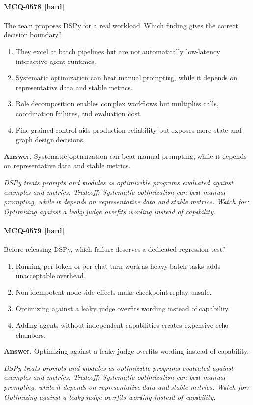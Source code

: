 \paragraph{MCQ-0578 [hard]} The team proposes DSPy for a real workload. Which finding gives the correct decision boundary?
\begin{enumerate}[label=\Alph*.]
\item They excel at batch pipelines but are not automatically low-latency interactive agent runtimes.
\item Systematic optimization can beat manual prompting, while it depends on representative data and stable metrics.
\item Role decomposition enables complex workflows but multiplies calls, coordination failures, and evaluation cost.
\item Fine-grained control aids production reliability but exposes more state and graph design decisions.
\end{enumerate}
\noindent\textbf{Answer.} Systematic optimization can beat manual prompting, while it depends on representative data and stable metrics.
\par\textit{DSPy treats prompts and modules as optimizable programs evaluated against examples and metrics. Tradeoff: Systematic optimization can beat manual prompting, while it depends on representative data and stable metrics. Watch for: Optimizing against a leaky judge overfits wording instead of capability.}
\paragraph{MCQ-0579 [hard]} Before releasing DSPy, which failure deserves a dedicated regression test?
\begin{enumerate}[label=\Alph*.]
\item Running per-token or per-chat-turn work as heavy batch tasks adds unacceptable overhead.
\item Non-idempotent node side effects make checkpoint replay unsafe.
\item Optimizing against a leaky judge overfits wording instead of capability.
\item Adding agents without independent capabilities creates expensive echo chambers.
\end{enumerate}
\noindent\textbf{Answer.} Optimizing against a leaky judge overfits wording instead of capability.
\par\textit{DSPy treats prompts and modules as optimizable programs evaluated against examples and metrics. Tradeoff: Systematic optimization can beat manual prompting, while it depends on representative data and stable metrics. Watch for: Optimizing against a leaky judge overfits wording instead of capability.}
